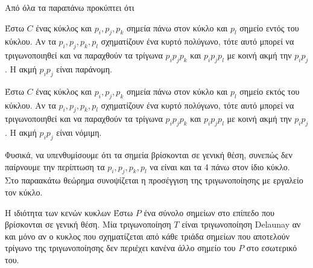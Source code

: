 \documentclass[oneside,12pt]{book}
\theoremstyle{definition}
\begin{document}
Από όλα τα παραπάνω προκύπτει ότι \\

\begin{mylemma}{}{}
	Έστω \(C\) ένας κύκλος και \(p_i, p_j, p_k\) σημεία πάνω στον κύκλο και \(p_l\) σημείο εντός του κύκλου. Αν τα \(p_i, p_j, p_k, p_l\) σχηματίζουν ένα κυρτό πολύγωνο, τότε αυτό μπορεί να τριγωνοποιηθεί και να παραχθούν τα τρίγωνα \(p_i p_j p_k\) και \(p_i p_j p_l\) με κοινή ακμή την \(p_i p_j\). Η ακμή \(p_i p_j\) είναι παράνομη.
\end{mylemma}

\begin{mylemma}{}{}
	Έστω \(C\) ένας κύκλος και \(p_i, p_j, p_k\) σημεία πάνω στον κύκλο και \(p_l\) σημείο εκτός του κύκλου. Αν τα \(p_i, p_j, p_k, p_l\) σχηματίζουν ένα κυρτό πολύγωνο, τότε αυτό μπορεί να τριγωνοποιηθεί και να παραχθούν τα τρίγωνα \(p_i p_j p_k\) και \(p_i p_j p_l\) με κοινή ακμή την \(p_i p_j\). Η ακμή \(p_i p_j\) είναι νόμιμη.
\end{mylemma}

Φυσικά, να υπενθυμίσουμε ότι τα σημεία βρίσκονται σε γενική θέση, συνεπώς δεν παίρνουμε την περίπτωση τα \(p_i, p_j, p_k, p_l\) να είναι και τα 4 πάνω στον ίδιο κύκλο. \\

Στο παραακάτω θεώρημα συνοψίζεται η προσέγγιση της τριγωνοποίησης με εργαλείο τον κύκλο. \\

\begin{mytheorem}{Η ιδιότητα των κενών κυκλων}{}
	Έστω \(P\) ένα σύνολο σημείων στο επίπεδο που βρίσκονται σε γενική θέση. Μία τριγωνοποίηση \(T\) είναι τριγωνοποίηση Delaunay αν και μόνο αν ο κυκλος που σχηματίζεται από κάθε τριάδα σημείων που αποτελούν τρίγωνο της τριγωνοποίησης δεν περιέχει κανένα άλλο σημείο του \(P\) στο εσωτερικό του.
\end{mytheorem}
\end{document}

